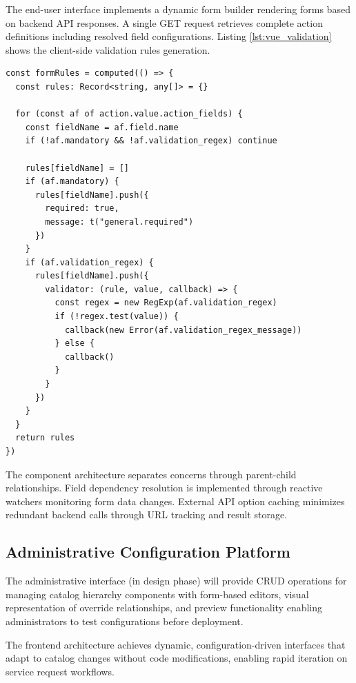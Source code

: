 The end-user interface implements a dynamic form builder rendering forms based on backend API responses. A single GET request retrieves complete action definitions including resolved field configurations. Listing \ref{lst:vue_validation} shows the client-side validation rules generation.

\begin{listing}[htbp]
\begin{verbatim}
const formRules = computed(() => {
  const rules: Record<string, any[]> = {}
  
  for (const af of action.value.action_fields) {
    const fieldName = af.field.name
    if (!af.mandatory && !af.validation_regex) continue
    
    rules[fieldName] = []
    if (af.mandatory) {
      rules[fieldName].push({
        required: true,
        message: t("general.required")
      })
    }
    if (af.validation_regex) {
      rules[fieldName].push({
        validator: (rule, value, callback) => {
          const regex = new RegExp(af.validation_regex)
          if (!regex.test(value)) {
            callback(new Error(af.validation_regex_message))
          } else {
            callback()
          }
        }
      })
    }
  }
  return rules
})
\end{verbatim}
\caption{Dynamic Form Validation Rules in Vue.js}
\label{lst:vue_validation}
\end{listing}

The component architecture separates concerns through parent-child relationships. Field dependency resolution is implemented through reactive watchers monitoring form data changes. External API option caching minimizes redundant backend calls through URL tracking and result storage.

\subsection{Administrative Configuration Platform}

The administrative interface (in design phase) will provide CRUD operations for managing catalog hierarchy components with form-based editors, visual representation of override relationships, and preview functionality enabling administrators to test configurations before deployment.

The frontend architecture achieves dynamic, configuration-driven interfaces that adapt to catalog changes without code modifications, enabling rapid iteration on service request workflows.